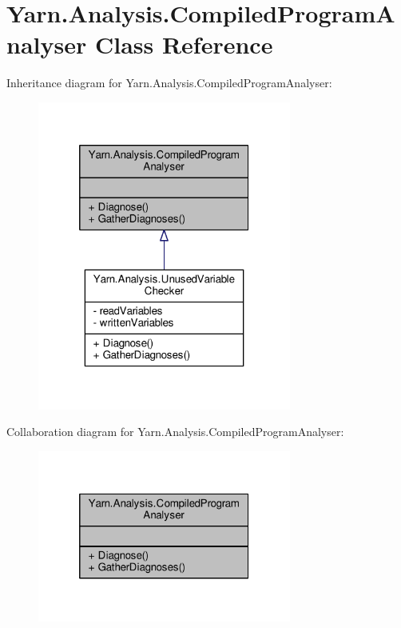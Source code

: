 \hypertarget{a00028}{\section{Yarn.\-Analysis.\-Compiled\-Program\-Analyser Class Reference}
\label{a00028}
}


Inheritance diagram for Yarn.\-Analysis.\-Compiled\-Program\-Analyser\-:
\nopagebreak
\begin{figure}[H]
\begin{center}
\leavevmode
\includegraphics[width=236pt]{d4/d8f/a00324}
\end{center}
\end{figure}


Collaboration diagram for Yarn.\-Analysis.\-Compiled\-Program\-Analyser\-:
\nopagebreak
\begin{figure}[H]
\begin{center}
\leavevmode
\includegraphics[width=236pt]{de/dc8/a00325}
\end{center}
\end{figure}
